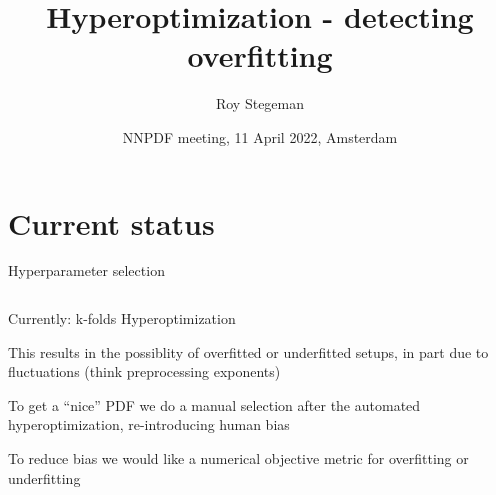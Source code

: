 \documentclass[aspectratio=169,11pt]{beamer}
\title{Hyperoptimization - detecting overfitting}
\date{NNPDF meeting, 11 April 2022, Amsterdam}
\author{Roy Stegeman}
\institute{University of Milan and INFN Milan}
\begin{document}
{
\begin{frame}
  \titlepage
\end{frame}
}




\section*{Current status}

\begin{frame}[t]{Hyperparameter selection}
  \begin{columns}[T]
    \begin{column}{0.6\textwidth}
      Currently: k-folds Hyperoptimization\\\vspace*{1em}

      This results in the possiblity of overfitted or underfitted setups, in part due to fluctuations (think preprocessing exponents)\\\vspace*{1em}

      To get a ``nice'' PDF we do a manual selection after the automated hyperoptimization, re-introducing human bias\\\vspace*{1em}

      To reduce bias we would like a numerical objective metric for overfitting or underfitting


\end{column}
\end{columns}
\end{frame}
\end{document}
